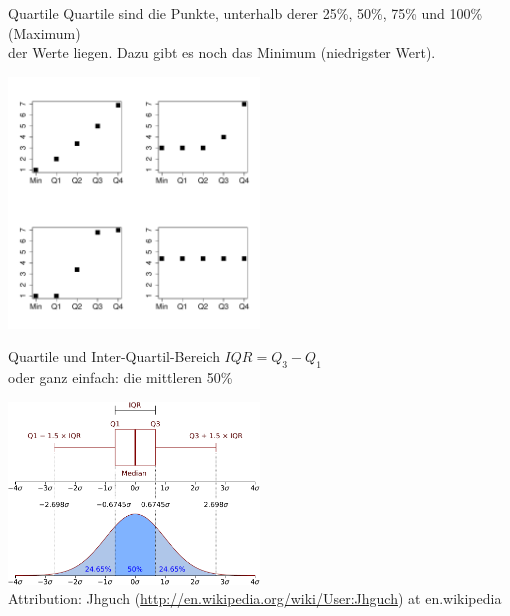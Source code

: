 \begin{frame}
  {Quartile}
  Quartile sind die Punkte, unterhalb derer 25\%, 50\%, 75\% und 100\% (Maximum)\\
  der Werte liegen. Dazu gibt es noch das Minimum (niedrigster Wert).
  \vspace{-0.5cm}
  \begin{center}
    \includegraphics[width=0.5\textwidth]{graphics/fourquartile}
  \end{center}
\end{frame}


\begin{frame}
  {Quartile und Inter-Quartil-Bereich}
  \alert{$IQR = Q_3-Q_1$}\\
  oder ganz einfach: die mittleren 50\%\\
  \begin{center}
    \includegraphics[width=0.5\textwidth]{graphics/boxplotpdf}\\
    {\tiny Attribution: Jhguch (\url{http://en.wikipedia.org/wiki/User:Jhguch}) at en.wikipedia}
  \end{center}
\end{frame}


